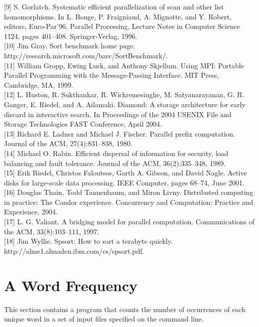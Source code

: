 \documentclass[
]{article}
\begin{document}
{[}9{]} S. Gorlatch. Systematic efficient parallelization of scan and
other list homomorphisms. In L. Bouge, P. Fraigniaud, A. Mignotte, and
Y. Robert, editors, Euro-Par'96. Parallel Processing, Lecture Notes in
Computer Science 1124, pages 401--408. Springer-Verlag, 1996.\\
{[}10{]} Jim Gray. Sort benchmark home page.
http://research.microsoft.com/barc/SortBenchmark/.\\
{[}11{]} William Gropp, Ewing Lusk, and Anthony Skjellum. Using MPI:
Portable Parallel Programming with the Message-Passing Interface. MIT
Press, Cambridge, MA, 1999.\\
{[}12{]} L. Huston, R. Sukthankar, R. Wickremesinghe, M. Satyanarayanan,
G. R. Ganger, E. Riedel, and A. Ailamaki. Diamond: A storage
architecture for early discard in interactive search. In Proceedings of
the 2004 USENIX File and Storage Technologies FAST Conference, April
2004.\\
{[}13{]} Richard E. Ladner and Michael J. Fischer. Parallel prefix
computation. Journal of the ACM, 27(4):831--838, 1980.\\
{[}14{]} Michael O. Rabin. Efficient dispersal of information for
security, load balancing and fault tolerance. Journal of the ACM,
36(2):335--348, 1989.\\
{[}15{]} Erik Riedel, Christos Faloutsos, Garth A. Gibson, and David
Nagle. Active disks for large-scale data processing. IEEE Computer,
pages 68--74, June 2001.\\
{[}16{]} Douglas Thain, Todd Tannenbaum, and Miron Livny. Distributed
computing in practice: The Condor experience. Concurrency and
Computation: Practice and Experience, 2004.\\
{[}17{]} L. G. Valiant. A bridging model for parallel computation.
Communications of the ACM, 33(8):103--111, 1997.\\
{[}18{]} Jim Wyllie. Spsort: How to sort a terabyte quickly.
http://alme1.almaden.ibm.com/cs/spsort.pdf.

\section{A Word Frequency}\label{a-word-frequency}

This section contains a program that counts the number of occurrences of
each unique word in a set of input files specified on the command line.
\end{document}
